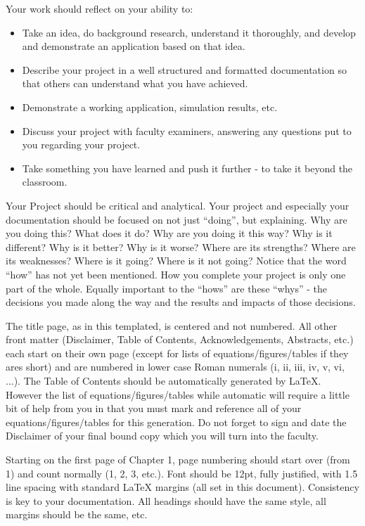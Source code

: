 \documentclass{report}[a4paper,12pt,onecolumn]
\begin{document}
Your work should reflect on your ability to:
\begin{itemize}
    \item Take an idea, do background research, understand it thoroughly, and develop and demonstrate an application based on that idea.
    \item Describe your project in a well structured and formatted documentation so that others can understand what you have achieved.
    \item Demonstrate a working application, simulation results, etc.
    \item Discuss your project with faculty examiners, answering any questions put to you regarding your project.
    \item Take something you have learned and push it further - to take it beyond the classroom.
\end{itemize}

Your Project should be critical and analytical. Your project and especially your documentation should be focused on not just ``doing'', but explaining. Why are you doing this? What does it do? Why are you doing it this way? Why is it different? Why is it better? Why is it worse? Where are its strengths? Where are its weaknesses? Where is it going? Where is it not going? Notice that the word ``how'' has not yet been mentioned. How you complete your project is only one part of the whole. Equally important to the ``hows'' are these ``whys'' - the decisions you made along the way and the results and impacts of those decisions.

The title page, as in this templated, is centered and not numbered. All other front matter (Disclaimer, Table of Contents, Acknowledgements, Abstracts, etc.) each start on their own page (except for lists of equations/figures/tables if they ares short) and are numbered in lower case Roman numerals (i, ii, iii, iv, v, vi, ...). The Table of Contents should be automatically generated by LaTeX. However the list of equations/figures/tables while automatic will require a little bit of help from you in that you must mark and reference all of your equations/figures/tables for this generation. Do not forget to sign and date the Disclaimer of your final bound copy which you will turn into the faculty.

Starting on the first page of Chapter 1, page numbering should start over (from 1) and count normally (1, 2, 3, etc.). Font should be 12pt, fully justified, with 1.5 line spacing with standard LaTeX margins (all set in this document). Consistency is key to your documentation. All headings should have the same style, all margins should be the same, etc.
\end{document}
